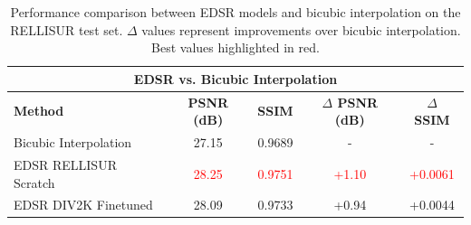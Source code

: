 \begin{table}[H]
\centering
\renewcommand{\arraystretch}{1.2}
\begin{tabular}{|l|c|c|c|c|}
\hline
\multicolumn{5}{|c|}{\cellcolor[HTML]{D8E9F7}\textbf{EDSR vs. Bicubic Interpolation}} \\
\hline
\rowcolor[HTML]{D8E9F7}
\textbf{Method} & \textbf{PSNR (dB)} & \textbf{SSIM} & \textbf{$\Delta$ PSNR (dB)} & \textbf{$\Delta$ SSIM} \\
\hline
Bicubic Interpolation & 27.15 & 0.9689 & - & - \\
\hline
EDSR RELLISUR Scratch & \textcolor{red}{28.25} & \textcolor{red}{0.9751} & \textcolor{red}{+1.10} & \textcolor{red}{+0.0061} \\
\hline
EDSR DIV2K Finetuned & 28.09 & 0.9733 & +0.94 & +0.0044 \\
\hline
\end{tabular}
\caption{Performance comparison between \acs{EDSR} models and bicubic interpolation on the \acs{RELLISUR} test set. $\Delta$ values represent improvements over bicubic interpolation. Best values highlighted in red.}
\label{tab:edsr_vs_bicubic}
\end{table}

